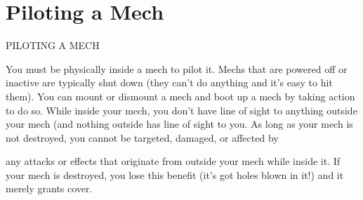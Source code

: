 \chapter{Piloting a Mech}
                                          PILOTING A MECH

You must be physically inside a mech to pilot it. Mechs that are powered off or inactive are
typically shut down (they can’t do anything and it’s easy to hit them). You can mount or
dismount a mech and boot up a mech by taking action to do so. While inside your mech, you
don’t have line of sight to anything outside your mech (and nothing outside has line of sight to
you. As long as your mech is not destroyed, you cannot be targeted, damaged, or affected by




any attacks or effects that originate from outside your mech while inside it. If your mech is
destroyed, you lose this benefit (it’s got holes blown in it!) and it merely grants cover.
